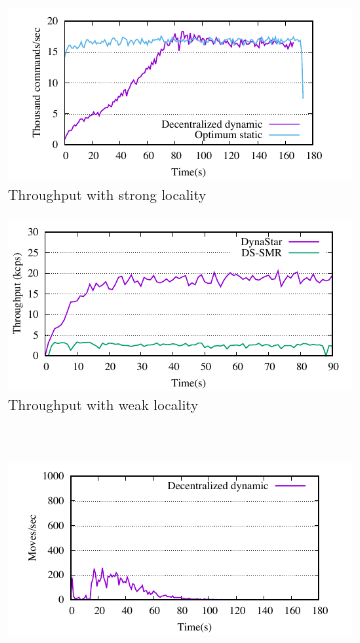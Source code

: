 \begin{figure}[ht!]
  \centering
  \begin{subfigure}[b]{0.45\textwidth}
    \centering
    \includegraphics[width=0.95\columnwidth]{figures/motivation-tp-strong-locality}    
    \caption{Throughput with strong locality }
  \end{subfigure}
  \begin{subfigure}[b]{0.45\textwidth}
    \centering
    \includegraphics[width=0.95\columnwidth]{figures/experiments/tp-dynastar-vs-dssmr-4p}
    \caption{Throughput with weak locality}
  \end{subfigure} \\
  \begin{subfigure}[b]{0.45\textwidth}
    \centering
    \includegraphics[width=0.95\columnwidth]{figures/motivation-moves-strong-locality}

\end{subfigure}
\end{figure}

